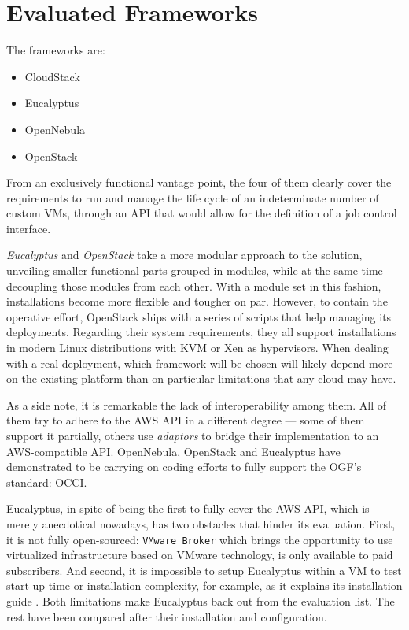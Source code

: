 \section{Evaluated Frameworks}\label{sec:frameworksevaluados}
\noindent The frameworks are:
\begin{itemize}
 \item CloudStack %
 \item Eucalyptus %
 \item OpenNebula %
 \item OpenStack
\end{itemize}

From an exclusively functional vantage point, the four of them clearly cover the requirements to run and manage the life cycle of an indeterminate number of custom VMs, through an API that would allow for the definition of a job control interface.

\emph{Eucalyptus} and \emph{OpenStack} take a more modular approach to the solution, unveiling smaller functional parts grouped in modules, while at the same time decoupling those modules from each other. With a module set in this fashion, installations become more flexible and tougher on par. However, to contain the operative effort, OpenStack ships with a series of scripts that help managing its deployments. Regarding their system requirements, they all support installations in modern Linux distributions with KVM or Xen as hypervisors. When dealing with a real deployment, which framework will be chosen will likely depend more on the existing platform than on particular limitations that any cloud may have.

As a side note, it is remarkable the lack of interoperability among them. All of them try to adhere to the AWS API in a different degree --- some of them support it partially, others use \emph{adaptors} to bridge their implementation to an AWS-compatible API. OpenNebula, OpenStack and Eucalyptus have demonstrated to be carrying on coding efforts to fully support the OGF's standard: OCCI.


Eucalyptus, in spite of being the first to fully cover the AWS API, which is merely anecdotical nowadays, has two obstacles that hinder its evaluation. First, it is not fully open-sourced: \texttt{VMware Broker} which brings the opportunity to use virtualized infrastructure based on  VMware technology, is only available to paid subscribers. And second, it is impossible to setup Eucalyptus within a VM to test start-up time or installation complexity, for example, as it explains its installation guide \cite{eucainstall}. Both limitations make Eucalyptus back out from the evaluation list. The rest have been compared after their installation and configuration.

